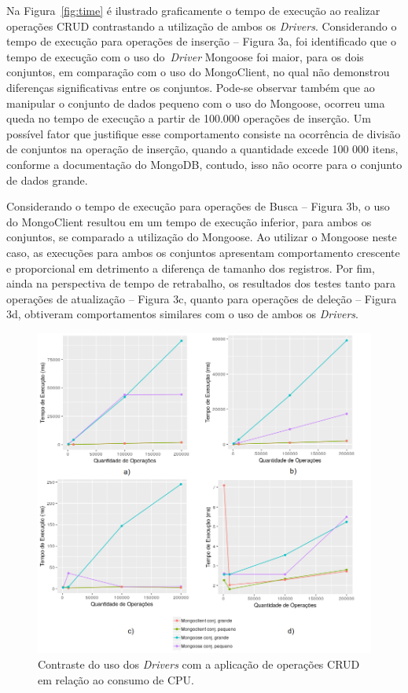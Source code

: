 \documentclass[12pt]{article}
\begin{document}
Na Figura~\ref{fig:time} é ilustrado graficamente o tempo de execução ao realizar operações CRUD contrastando a utilização de ambos os \emph{Drivers}. Considerando o tempo de execução para operações de inserção -- Figura 3a, foi identificado que o tempo de execução com o uso do~\emph{Driver} Mongoose foi maior, para os dois conjuntos, em comparação com o uso do MongoClient, no qual não demonstrou diferenças significativas entre os conjuntos. Pode-se observar também que ao manipular o conjunto de dados pequeno com o uso do Mongoose, ocorreu uma queda no tempo de execução a partir de 100.000 operações de inserção. Um possível fator que justifique esse comportamento consiste na ocorrência de divisão de conjuntos na operação de inserção, quando a quantidade excede 100 000 itens, conforme a documentação do MongoDB, contudo, isso não ocorre para o conjunto de dados grande.

Considerando o tempo de execução para operações de Busca -- Figura 3b, o uso do MongoClient resultou em um tempo de execução inferior, para ambos os conjuntos, se comparado a utilização do Mongoose. Ao utilizar o Mongoose neste caso, as execuções para ambos os conjuntos apresentam comportamento crescente e proporcional em detrimento a diferença de tamanho dos registros. Por fim, ainda na perspectiva de tempo de retrabalho, os resultados dos testes tanto para operações de atualização -- Figura 3c, quanto para operações de deleção -- Figura 3d, obtiveram comportamentos similares com o uso de ambos os \emph{Drivers}.

\begin{figure}[!ht]
    \centering
    \includegraphics[width=\textwidth]{images/cpuusage}
	 \caption{Contraste do uso dos \emph{Drivers} com a aplicação de operações CRUD em relação ao consumo de CPU.}
    \label{fig:cpuusage}
\end{figure}
\end{document}
